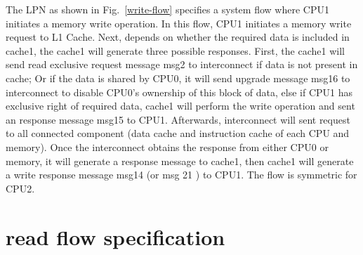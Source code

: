 \documentclass[conference]{IEEEtran}
\begin{document}
 The LPN as shown in Fig.~\ref{write-flow} specifies a system flow where CPU1 initiates a memory write operation. In this flow, CPU1 initiates a memory write request to L1 Cache. Next, depends on whether the required data is included in cache1, the cache1 will generate three possible responses. First, the cache1 will send read exclusive request message msg2 to interconnect if data is not present in cache; Or if the data is shared by CPU0, it will send upgrade message msg16 to interconnect to disable CPU0's ownership of this block of data, else if CPU1 has exclusive right of required data, cache1 will perform the write operation and sent an response message msg15 to CPU1. Afterwards, interconnect will sent request to all connected component (data cache and instruction cache of each CPU and memory). Once the interconnect obtains the response from either CPU0 or memory, it will generate a response message to cache1, then cache1 will generate a write response message msg14 (or msg 21 ) to CPU1. The flow is symmetric for CPU2.
 
 
 
 \section{read flow specification}
 
\end{document}
